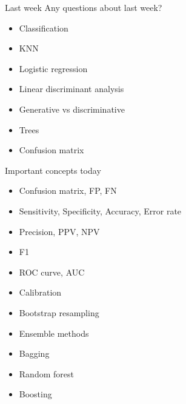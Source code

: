 \documentclass[xcolor=table,aspectratio=169]{beamer}
\begin{document}

\begin{frame}
	{Last week}
	Any questions about last week?
	
	\begin{itemize}
		\item Classification
		\item KNN
		\item Logistic regression
		\item Linear discriminant analysis
		\item Generative vs discriminative
		\item Trees
		\item Confusion matrix
	\end{itemize}
\end{frame}

\begin{frame}
	{Important concepts today}
	
	\begin{itemize}
		\item Confusion matrix, FP, FN
		\item Sensitivity, Specificity, Accuracy, Error rate
		\item Precision, PPV, NPV
		\item F1
		\item ROC curve, AUC
		\item Calibration
		\item Bootstrap resampling
		\item Ensemble methods
		\item Bagging
		\item Random forest
		\item Boosting
	\end{itemize}
\end{frame}
\end{document}
